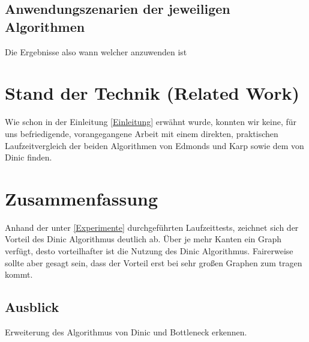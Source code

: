 \documentclass[a4paper]{llncs}
\begin{document}
\subsection{Anwendungszenarien der jeweiligen Algorithmen}
Die Ergebnisse also wann welcher anzuwenden ist

\section{Stand der Technik (Related Work)}
\label{Related Work}
Wie schon in der Einleitung \ref{Einleitung} erwähnt wurde, konnten wir keine, für uns befriedigende, vorangegangene Arbeit mit einem direkten, praktischen Laufzeitvergleich der beiden Algorithmen von Edmonds und Karp sowie dem von Dinic finden.

\section{Zusammenfassung}
\label{Zusammenfassung}
Anhand der unter \ref{Experimente} durchgeführten Laufzeittests, zeichnet sich der Vorteil des Dinic Algorithmus deutlich ab. Über je mehr Kanten ein Graph verfügt, desto vorteilhafter ist die Nutzung des Dinic Algorithmus. Fairerweise sollte aber gesagt sein, dass der Vorteil erst bei sehr großen Graphen zum tragen kommt. 
\subsection{Ausblick}
Erweiterung des Algorithmus von Dinic und Bottleneck erkennen.


 
\end{document}
